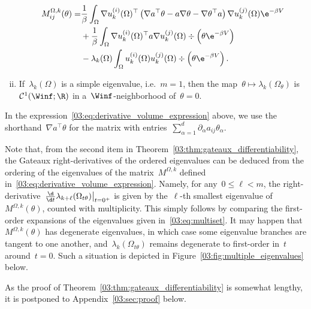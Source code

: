 \begin{theorem}
\begin{enumerate}[i)]
{\begin{equation}
            \begin{aligned}
                \label{03:eq:derivative_volume_expression}
            M^{\Omega,k}_{ij}(\theta) = &\frac1\beta\int_\Omega \nabla u_k^{(i)}(\Omega)^\top \left(\nabla a^\top \theta -a\nabla \theta -\nabla\theta^\top a\right)\nabla u_k^{(j)}(\Omega)\e^{-\beta V}
            \\&+ \frac1\beta \int_\Omega \nabla u_k^{(i)}(\Omega)^\top a \nabla u_k^{(j)}(\Omega)\div\left(\theta\e^{-\beta V}\right)\\
            &-\lambda_k(\Omega)\int_\Omega u_k^{(i)}(\Omega)u_k^{(j)}(\Omega)\div\left(\theta\e^{-\beta V}\right).
        \end{aligned}
        \end{equation}
        }
        \item{
            If~$\lambda_k(\Omega)$ is a simple eigenvalue, i.e.~$m=1$, then the map~$\theta\mapsto \lambda_k(\Omega_\theta)$ is~$\mathcal C^1(\Winf;\R)$ in a~$\Winf$-neighborhood of~$\theta=0$.
        }
    \end{enumerate}
    In the expression~\eqref{03:eq:derivative_volume_expression} above, we use the shorthand~$\nabla a^\top \theta$ for the matrix with entries~$\sum_{\alpha=1}^d\partial_{\alpha}a_{ij}\theta_\alpha$.
\end{theorem}
\begin{remark}
    Note that, from the second item in Theorem~\ref{03:thm:gateaux_differentiability}, the Gateaux right-derivatives of the ordered eigenvalues can be deduced from the ordering of the eigenvalues of the matrix~$M^{\Omega,k}$ defined in~\eqref{03:eq:derivative_volume_expression}.
    Namely, for any~$0\leq \ell< m$, the right-derivative~$\frac{\d}{\d t}\lambda_{k+\ell}(\Omega_{t\theta})\big|_{t=0^+}$ is given by the~$\ell$-th smallest eigenvalue of~$M^{\Omega,k}(\theta)$, counted with multiplicity.
    This simply follows by comparing the first-order expansions of the eigenvalues given in~\eqref{03:eq:multiset}.
    It may happen that~$M^{\Omega,k}(\theta)$ has degenerate eigenvalues, in which case some eigenvalue branches are tangent to one another, and~$\lambda_{k}(\Omega_{t\theta})$ remains degenerate to first-order in~$t$ around~$t=0$.
    Such a situation is depicted in Figure~\ref{03:fig:multiple_eigenvalues} below.
\end{remark}
As the proof of Theorem~\ref{03:thm:gateaux_differentiability} is somewhat lengthy, it is postponed to Appendix~\ref{03:sec:proof} below.
